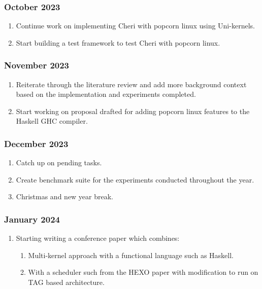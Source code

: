  \subsubsection{October 2023}
  \begin{enumerate}
    \item Continue work on implementing Cheri with popcorn linux using Uni-kernels. 
    \item Start building a test framework to test Cheri with popcorn linux.
 \end{enumerate}

 \subsubsection{November 2023}
  \begin{enumerate}
    \item Reiterate through the literature review and add more background context based on the implementation and experiments 
    completed.
    \item Start working on proposal drafted for adding popcorn linux features to the Haskell GHC compiler.
 \end{enumerate}

 \subsubsection{December 2023}
  \begin{enumerate}
    \item Catch up on pending tasks.
    \item Create benchmark suite for the experiments conducted throughout the year.
    \item Christmas and new year break.
 \end{enumerate}

 \subsubsection{January 2024}
  \begin{enumerate}
    \item Starting writing a conference paper which combines:
    \begin{enumerate}
        \item Multi-kernel approach with a functional language such as Haskell.
        \item With a scheduler such from the HEXO paper with modification to run on TAG based architecture. 
      \end{enumerate}
 \end{enumerate}

